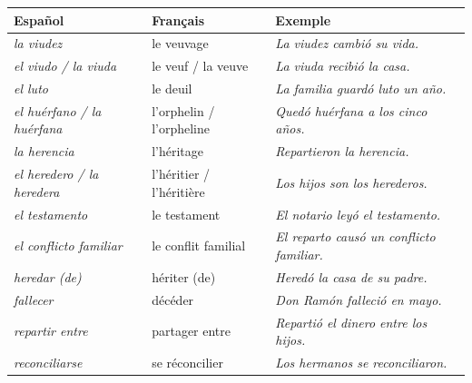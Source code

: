 \documentclass[11pt]{article}
\newcommand{\esp}[1]{\ifmmode\text{\textit{#1}}\else\begingroup\selectlanguage{spanish}\itshape #1\endgroup\fi}
\begin{document}
\begin{definition}
\begin{center}
\begin{tabularx}{\linewidth}{|l|X|X|}\hline
\rowcolor{popblueL} \textbf{Español} & \textbf{Français} & \textbf{Exemple} \\ \hline
\esp{la viudez} & le veuvage & \esp{La viudez cambió su vida.} \\ \hline
\esp{el viudo / la viuda} & le veuf / la veuve & \esp{La viuda recibió la casa.} \\ \hline
\esp{el luto} & le deuil & \esp{La familia guardó luto un año.} \\ \hline
\esp{el huérfano / la huérfana} & l'orphelin / l'orpheline & \esp{Quedó huérfana a los cinco años.} \\ \hline
\esp{la herencia} & l'héritage & \esp{Repartieron la herencia.} \\ \hline
\esp{el heredero / la heredera} & l'héritier / l'héritière & \esp{Los hijos son los herederos.} \\ \hline
\esp{el testamento} & le testament & \esp{El notario leyó el testamento.} \\ \hline
\esp{el conflicto familiar} & le conflit familial & \esp{El reparto causó un conflicto familiar.} \\ \hline
\esp{heredar (de)} & hériter (de) & \esp{Heredó la casa de su padre.} \\ \hline
\esp{fallecer} & décéder & \esp{Don Ramón falleció en mayo.} \\ \hline
\esp{repartir entre} & partager entre & \esp{Repartió el dinero entre los hijos.} \\ \hline
\esp{reconciliarse} & se réconcilier & \esp{Los hermanos se reconciliaron.} \\ \hline
\end{tabularx}
\end{center}
\end{definition}
\end{document}

